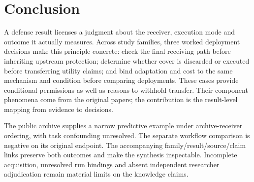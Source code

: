 \section{Conclusion}\label{sec:conclusion}
A defense result licenses a judgment about the receiver, execution mode and outcome it actually measures. Across \FinalN{} study families, three worked deployment decisions make this principle concrete: check the final receiving path before inheriting upstream protection; determine whether cover is discarded or executed before transferring utility claims; and bind adaptation and cost to the same mechanism and condition before comparing deployments. These cases provide conditional permissions as well as reasons to withhold transfer. Their component phenomena come from the original papers; the contribution is the result-level mapping from evidence to decisions.

The public archive supplies a narrow predictive example under archive-receiver ordering, with task confounding unresolved. The separate workflow comparison is negative on its original endpoint. The accompanying family/result/source/claim links preserve both outcomes and make the synthesis inspectable. Incomplete acquisition, unresolved run bindings and absent independent researcher adjudication remain material limits on the knowledge claims.
